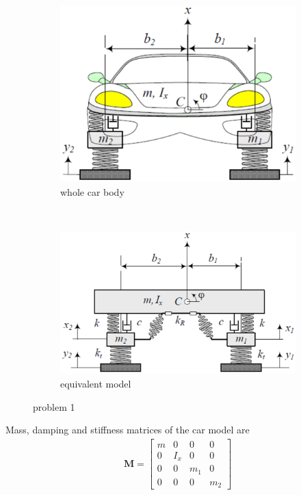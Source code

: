 \documentclass[]{report}
\begin{document}
\begin{figure}[ht!]
\begin{subfigure}[b]{0.5\textwidth}
\includegraphics[width=\textwidth]{./Figures/2st_Assignment} \caption{whole car body}
\end{subfigure}~
\begin{subfigure}[b]{0.5\textwidth}
\includegraphics[width=\textwidth]{./Figures/2st_Assignment_1}
\caption{equivalent model}
\end{subfigure}
\caption{problem 1}
\label{fig:2st_Assignment}
\end{figure}
Mass, damping and stiffness matrices of the car model are
\begin{align*}
\mathbf{M}=\left[\begin{array}{cccc}
m&0&0&0\\
0&I_x&0&0 \\
0&0&m_1&0 \\
0&0&0&m_2
\end{array}\right]
\end{align*}
\end{document}
